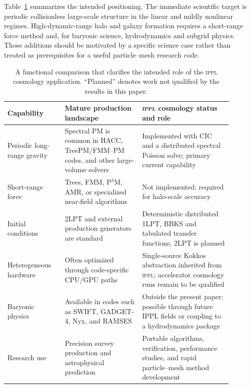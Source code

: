 \documentclass[11pt]{article}
\newcommand{\IPPL}{\textnormal{\textsc{ippl}}\xspace}
\begin{document}
Table~\ref{tab:positioning} summarizes the intended positioning.  The immediate
scientific target is periodic collisionless large-scale structure in the
linear and mildly nonlinear regimes.  High-dynamic-range halo and galaxy
formation requires a short-range force method and, for baryonic science,
hydrodynamics and subgrid physics.  Those additions should be motivated by a
specific science case rather than treated as prerequisites for a useful
particle--mesh research code.

\begin{table}[htbp]
  \centering
  \caption{A functional comparison that clarifies the intended role of the
  \IPPL cosmology application.  ``Planned'' denotes work not qualified by the
  results in this paper.}
  \label{tab:positioning}
  \begin{tabular}{@{}p{0.23\linewidth}p{0.31\linewidth}p{0.36\linewidth}@{}}
    \toprule
    Capability & Mature production landscape & \IPPL cosmology status and role \\
    \midrule
    Periodic long-range gravity & Spectral PM is common in HACC, TreePM/FMM--PM
      codes, and other large-volume solvers & Implemented with CIC and a
      distributed spectral Poisson solve; primary current capability \\
    Short-range force & Trees, FMM, P$^3$M, AMR, or specialized near-field
      algorithms & Not implemented; required for halo-scale accuracy \\
    Initial conditions & 2LPT and external production generators are standard &
      Deterministic distributed 1LPT, BBKS and tabulated transfer functions;
      2LPT is planned \\
    Heterogeneous hardware & Often optimized through code-specific CPU/GPU
      paths & Single-source Kokkos abstraction inherited from \IPPL; accelerator
      cosmology runs remain to be qualified \\
    Baryonic physics & Available in codes such as SWIFT, GADGET-4, Nyx, and
      RAMSES & Outside the present paper; possible through future IPPL fields or
      coupling to a hydrodynamics package \\
    Research use & Precision survey production and astrophysical prediction &
      Portable algorithms, verification, performance studies, and rapid
      particle--mesh method development \\
    \bottomrule
  \end{tabular}
\end{table}
\end{document}
